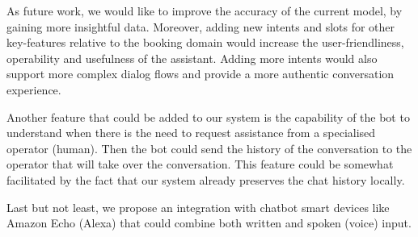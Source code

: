 \documentclass[runningheads,a4paper,11pt]{report}
\begin{document}
As future work, we would like to improve the accuracy of the current model, by gaining more insightful data. Moreover, adding new intents and slots for other key-features relative to the booking domain would increase the user-friendliness, operability and usefulness of the assistant. Adding more intents would also support more complex dialog flows and provide a more authentic conversation experience.

Another feature that could be added to our system is the capability of the bot to understand when there is the need to request assistance from a specialised operator (human). Then the bot could send the history of the conversation to the operator that will take over the conversation. This feature could be somewhat facilitated by the fact that our system already preserves the chat history locally. 

Last but not least, we propose an integration with chatbot smart devices like Amazon Echo (Alexa) that could combine both written and spoken (voice) input.




\end{document}
